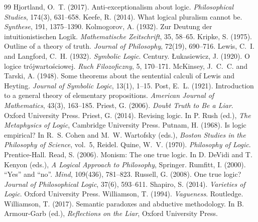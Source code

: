 \documentclass{situationist-preprint}
\begin{document}
\begin{thebibliography}{99}
 Hjortland, O.~T. (2017). Anti-exceptionalism about logic. \emph{Philosophical Studies}, 174(3), 631--658.
 Keefe, R. (2014). What logical pluralism cannot be. \emph{Synthese}, 191, 1375--1390.
 Kolmogorov, A. (1932). Zur Deutung der intuitionistischen Logik. \emph{Mathematische Zeitschrift}, 35, 58--65.
 Kripke, S. (1975). Outline of a theory of truth. \emph{Journal of Philosophy}, 72(19), 690--716.
 Lewis, C.~I. and Langford, C.~H. (1932). \emph{Symbolic Logic}. Century.
 Łukasiewicz, J. (1920). O logice trójwartościowej. \emph{Ruch Filozoficzny}, 5, 170--171.
 McKinsey, J.~C.~C. and Tarski, A. (1948). Some theorems about the sentential calculi of Lewis and Heyting. \emph{Journal of Symbolic Logic}, 13(1), 1--15.
 Post, E.~L. (1921). Introduction to a general theory of elementary propositions. \emph{American Journal of Mathematics}, 43(3), 163--185.
 Priest, G. (2006). \emph{Doubt Truth to Be a Liar}. Oxford University Press.
 Priest, G. (2014). Revising logic. In P. Rush (ed.), \emph{The Metaphysics of Logic}, Cambridge University Press.
 Putnam, H. (1968). Is logic empirical? In R.~S. Cohen and M.~W. Wartofsky (eds.), \emph{Boston Studies in the Philosophy of Science}, vol.~5, Reidel.
 Quine, W.~V. (1970). \emph{Philosophy of Logic}. Prentice-Hall.
 Read, S. (2006). Monism: The one true logic. In D. DeVidi and T. Kenyon (eds.), \emph{A Logical Approach to Philosophy}, Springer.
 Rumfitt, I. (2000). \enquote{Yes} and \enquote{no}. \emph{Mind}, 109(436), 781--823.
 Russell, G. (2008). One true logic? \emph{Journal of Philosophical Logic}, 37(6), 593--611.
 Shapiro, S. (2014). \emph{Varieties of Logic}. Oxford University Press.
 Williamson, T. (1994). \emph{Vagueness}. Routledge.
 Williamson, T. (2017). Semantic paradoxes and abductive methodology. In B. Armour-Garb (ed.), \emph{Reflections on the Liar}, Oxford University Press.
\end{thebibliography}
\end{document}
